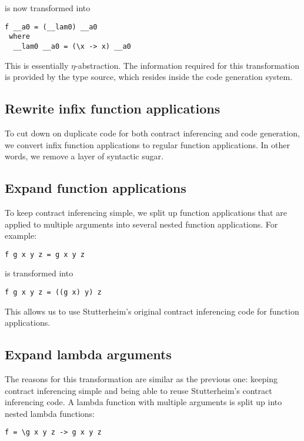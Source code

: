 \documentclass[10pt]{report}
\begin{document}
is now transformed into

\begin{lstlisting}[caption=Result of $\eta$-abstraction transformation.]
f __a0 = (__lam0) __a0                
 where                    
  __lam0 __a0 = (\x -> x) __a0
\end{lstlisting}

This is essentially $\eta$-abstraction.
The information required for this transformation is provided by the type source,  which resides inside the code generation system.

\subsection{Rewrite infix function applications}
To cut down on duplicate code for both contract inferencing and code generation, we convert infix function applications to regular function applications.
In other words, we remove a layer of syntactic sugar.

\subsection{Expand function applications}
To keep contract inferencing simple, we split up function applications that are applied to multiple arguments into several nested function applications.
For example:

\begin{lstlisting}
f g x y z = g x y z
\end{lstlisting}

is transformed into

\begin{lstlisting}[caption=Result of function application expansion transformation.]
f g x y z = ((g x) y) z
\end{lstlisting}

This allows us to use Stutterheim's original contract inferencing code for function applications.

\subsection{Expand lambda arguments}
The reasons for this transformation are similar as the previous one: keeping contract inferencing simple and being able to reuse Stutterheim's contract inferencing code.
A lambda function with multiple arguments is split up into nested lambda functions:

\begin{lstlisting}
f = \g x y z -> g x y z
\end{lstlisting}
\end{document}
